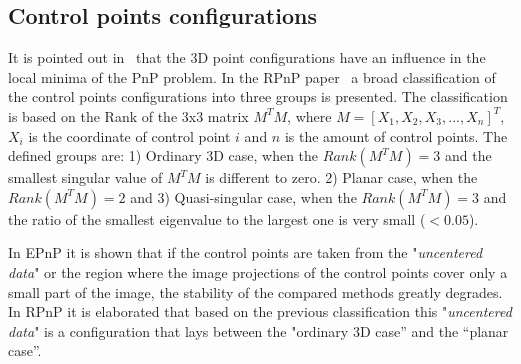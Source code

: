 \documentclass[letterpaper, 10 pt, conference]{ieeeconf}  %
\begin{document}
	
	
	
	
	
	
	\subsection{Control points configurations}
	
	
	It is pointed out in~\cite{Lepetit2008,Li2012} that the 3D point configurations have an influence in the local minima of the PnP problem. In the RPnP paper~\cite{Li2012} a broad classification of the control points configurations into three groups is presented. The classification is based on the Rank of the 3x3 matrix $M^TM$, where $M = [X_1, X_2, X_3, ... ,X_n]^T$, $X_i$ is the coordinate of control point $i$ and $n$ is the amount of control points. The defined groups are: 1) Ordinary 3D case, when the $Rank(M^TM) = 3$  and the smallest singular value of $M^TM$ is different to zero. 2) Planar case, when the $Rank(M^TM) = 2$ and 3) Quasi-singular case, when the $Rank(M^TM) = 3$ and the ratio of the smallest eigenvalue to the largest one is very small ($< 0.05$). 
	
	In EPnP it is shown that if the control points are taken from the "\textit{uncentered data}" or the region where the image projections of the control points cover only a small part of the image, the stability of the compared methods greatly degrades. In RPnP it is elaborated that based on the previous classification this "\textit{uncentered data}" is a configuration that lays between the "ordinary 3D case” and the “planar case”.
	
\end{document}
